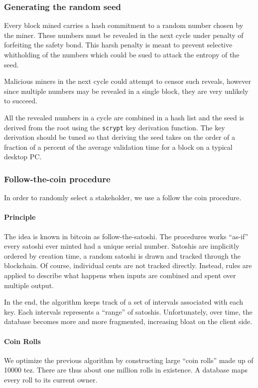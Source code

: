 \documentclass[letterpaper]{article}
\begin{document}
\subsubsection{Generating the random seed}

Every block mined carries a hash commitment to a random number chosen by the
miner. These numbers must be revealed in the next cycle under penalty of
forfeiting the safety bond. This harsh penalty is meant to prevent selective
whitholding of the numbers which could be sued to attack the entropy of the seed. 

Malicious miners in the next cycle could attempt to censor such reveals, however
since multiple numbers may be revealed in a single block, they are very unlikely
to succeed.

All the revealed numbers in a cycle are combined in a hash list and the seed is
derived  from the root using the \verb!scrypt! key derivation function. The key
derivation should be tuned so that deriving the seed takes on the order of a
fraction of a percent of the average validation time for a block on a typical
desktop PC.

\subsubsection{Follow-the-coin procedure}

In order to randomly select a stakeholder, we use a follow the coin procedure.

\paragraph{Principle}
The idea is known in bitcoin as follow-the-satoshi. The procedures works
``as-if'' every satoshi ever minted had a unique serial number. Satoshis are
implicitly ordered by creation time, a random satoshi is drawn and tracked
through the blockchain. Of course, individual cents are not tracked directly.
Instead, rules are applied to describe what happens when inputs are combined and
spent over multiple output.

In the end, the algorithm keeps track of a set of intervals associated with each
key. Each intervals represents a ``range'' of satoshis.
Unfortunately, over time, the database becomes more and more fragmented,
increasing bloat on the client side.

\paragraph{Coin Rolls}
We optimize the previous algorithm by constructing large ``coin rolls'' made up
of \num{10000} tez. There are thus about one million rolls in existence. A
database maps every roll to its current owner.
\end{document}
